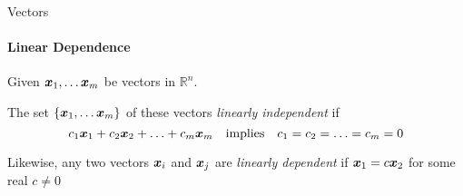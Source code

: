 \begin{frame}{Vectors}
    \framesubtitle{Linear Dependence}
    \begin{boxed}
        Given $\bm{x}_1, \ldots \bm{x}_m$ be vectors in $\mathbb{R}^n$.

        The set $\{ \bm{x}_1, \ldots \bm{x}_m \}$ of these vectors \emph{linearly independent} if
        $$c_1 \bm{x}_1 + c_2 \bm{x}_2 + \ldots + c_m \bm{x}_m \quad \text{implies} \quad c_1 = c_2 = \ldots = c_m = 0$$
    \end{boxed}
    Likewise, any two vectors $\bm{x}_i$ and $\bm{x}_j$ are \emph{linearly dependent} if $\bm{x}_1 = c \bm{x}_2$
    for some real $c \neq 0$\\[3mm]
\end{frame}


